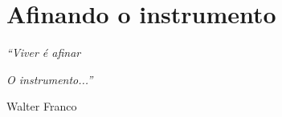 \chapter{Afinando o instrumento}

\singlespacing
\begin{flushright}

\textit{``Viver é afinar}

\textit{O instrumento...''}

Walter Franco
\end{flushright}
\doublespacing
